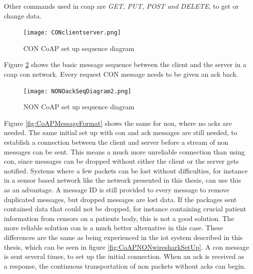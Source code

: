 Other commands used in \gls{coap} are \textit{GET, PUT, POST and DELETE}, to get or change data. 



\begin{figure}[ht]
    \centering
    \texttt{[image: CONclientserver.png]}    
    \caption{CON CoAP set up sequence diagram}
    \label{fig:CONclientserver}
\end{figure}

Figure \ref{fig:NONOackSeqDiagram} shows the basic message sequence between the client and the server in a \gls{coap} \gls{con} network. Every request CON message needs to be given an ack back. 

\begin{figure}[ht]
    \centering
    \texttt{[image: NONOackSeqDiagram2.png]}    
    \caption{NON CoAP set up sequence diagram}
    \label{fig:NONOackSeqDiagram}
\end{figure}


Figure \ref{fig:CoAPMessageFormat} shows the same for \gls{non}, where no \glspl{ack} are needed. The same initial set up with con and ack messages are still needed, to establish a connection between the client and server before a stream of \gls{non} messages can be sent. This means a much more unreliable connection than using \gls{con}, since messages can be dropped without either the client or the server gets notified. Systems where a few packets can be lost without difficulties, for instance in a sensor based network like the network presented in this thesis, can use this as an advantage. A message ID is still provided to every message to remove duplicated messages, but dropped messages are lost data. If the packages sent contained data that could not be dropped, for instance containing crucial patient information from censors on a patients body, this is not a good solution. The more reliable solution \gls{con} is a much better alternative in this case. These differences are the same as being experienced in the \gls{iot} system described in this thesis, which can be seen in figure \ref{fig:CoAPNONwiresharkSetUp}. A \gls{con} message is sent several times, to set up the initial connection. When an \gls{ack} is received as a response, the continuous transportation of \gls{non} packets without \glspl{ack} can begin. 

